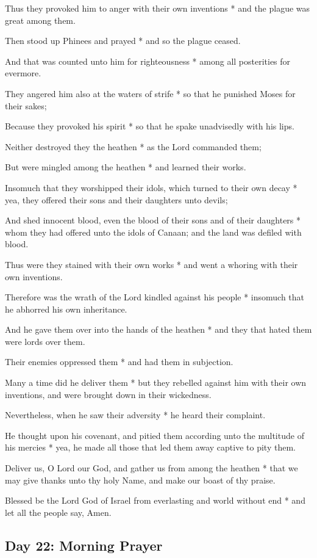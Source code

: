 Thus they provoked him to anger with their own inventions * and the plague was great among them.

Then stood up Phinees and prayed * and so the plague ceased.

And that was counted unto him for righteousness * among all posterities for evermore.

They angered him also at the waters of strife * so that he punished Moses for their sakes;

Because they provoked his spirit * so that he spake unadvisedly with his lips.

Neither destroyed they the heathen * as the Lord commanded them;

But were mingled among the heathen * and learned their works.

Insomuch that they worshipped their idols, which turned to their own decay * yea, they offered their sons and their daughters unto devils;

And shed innocent blood, even the blood of their sons and of their daughters * whom they had offered unto the idols of Canaan; and the land was defiled with blood.

Thus were they stained with their own works * and went a whoring with their own inventions.

Therefore was the wrath of the Lord kindled against his people * insomuch that he abhorred his own inheritance.

And he gave them over into the hands of the heathen * and they that hated them were lords over them.

Their enemies oppressed them * and had them in subjection.

Many a time did he deliver them * but they rebelled against him with their own inventions, and were brought down in their wickedness.

Nevertheless, when he saw their adversity * he heard their complaint.

He thought upon his covenant, and pitied them according unto the multitude of his mercies * yea, he made all those that led them away captive to pity them.

Deliver us, O Lord our God, and gather us from among the heathen * that we may give thanks unto thy holy Name, and make our boast of thy praise.

Blessed be the Lord God of Israel from everlasting and world without end * and let all the people say, Amen.

\subsection{Day 22: Morning Prayer}

